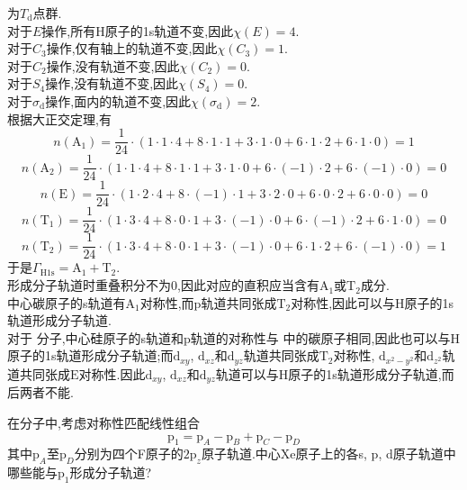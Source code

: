 \documentclass{ctexart}
\begin{document}
\begin{solution}
    为$T_\text{d}$点群.\\
    对于$E$操作,所有H原子的1s轨道不变,因此$\chi(E)=4$.\\
    对于$C_3$操作,仅有轴上的轨道不变,因此$\chi(C_3)=1$.\\
    对于$C_2$操作,没有轨道不变,因此$\chi(C_2)=0$.\\
    对于$S_4$操作,没有轨道不变,因此$\chi(S_4)=0$.\\
    对于$\sigma_\text{d}$操作,面内的轨道不变,因此$\chi(\sigma_\text{d})=2$.\\
    根据大正交定理,有
    \[n(\text{A}_1)=\dfrac{1}{24}\cdot(1\cdot1\cdot4+8\cdot1\cdot1+3\cdot1\cdot0+6\cdot1\cdot2+6\cdot1\cdot0)=1\]
    \[n(\text{A}_2)=\dfrac{1}{24}\cdot(1\cdot1\cdot4+8\cdot1\cdot1+3\cdot1\cdot0+6\cdot(-1)\cdot2+6\cdot(-1)\cdot0)=0\]
    \[n(\text{E})=\dfrac{1}{24}\cdot(1\cdot2\cdot4+8\cdot(-1)\cdot1+3\cdot2\cdot0+6\cdot0\cdot2+6\cdot0\cdot0)=0\]
    \[n(\text{T}_1)=\dfrac{1}{24}\cdot(1\cdot3\cdot4+8\cdot0\cdot1+3\cdot(-1)\cdot0+6\cdot(-1)\cdot2+6\cdot1\cdot0)=0\]
    \[n(\text{T}_2)=\dfrac{1}{24}\cdot(1\cdot3\cdot4+8\cdot0\cdot1+3\cdot(-1)\cdot0+6\cdot1\cdot2+6\cdot(-1)\cdot0)=1\]
    于是$\Gamma_{\text{H1s}}=\text{A}_1+\text{T}_2$.\\
    形成分子轨道时重叠积分不为$0$,因此对应的直积应当含有$\text{A}_1$或$\text{T}_2$成分.\\
    中心碳原子的s轨道有$\text{A}_1$对称性,而p轨道共同张成$\text{T}_2$对称性,因此可以与H原子的1s轨道形成分子轨道.\\
    对于 分子,中心硅原子的s轨道和p轨道的对称性与 中的碳原子相同,因此也可以与H原子的1s轨道形成分子轨道;而$\text{d}_{xy}$, $\text{d}_{xz}$和$\text{d}_{yz}$轨道共同张成$\text{T}_2$对称性, $\text{d}_{x^2-y^2}$和$\text{d}_{z^2}$轨道共同张成$\text{E}$对称性.因此$\text{d}_{xy}$, $\text{d}_{xz}$和$\text{d}_{yz}$轨道可以与H原子的1s轨道形成分子轨道,而后两者不能.
\end{solution}
\begin{homework}[13.]
    在分子中,考虑对称性匹配线性组合
    \[\text{p}_1=\text{p}_A-\text{p}_B+\text{p}_C-\text{p}_D\]
    其中$\text{p}_A$至$\text{p}_D$分别为四个F原子的$2\text{p}_z$原子轨道.中心Xe原子上的各s, p, d原子轨道中哪些能与$\text{p}_1$形成分子轨道?
\end{homework}
\end{document}
